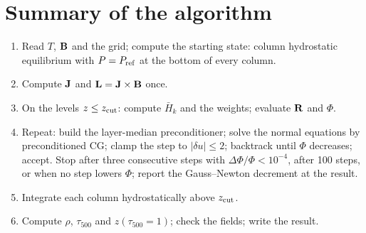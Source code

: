 \adjointpoissontrue


\section{Summary of the algorithm}
\begin{enumerate}
\item Read $T$, $\mathbf B$ and the grid; compute the starting state: column hydrostatic equilibrium with $P=P_{\rm ref}$ at the bottom
of every column.
\item Compute $\mathbf J$ and $\mathbf L=\mathbf J\times\mathbf B$ once.
\item On the levels $z\le z_{\rm cut}$: compute $\bar H_k$ and the weights; evaluate $\mathbf R$ and $\Phi$.
\item Repeat: build the layer-median preconditioner; solve the normal equations by preconditioned CG; clamp the step to
$|\delta u|\le2$; backtrack until $\Phi$ decreases; accept. Stop after three consecutive steps with
$\Delta\Phi/\Phi<10^{-4}$, after 100 steps, or when no step lowers $\Phi$; report the Gauss--Newton decrement at the result.
\item Integrate each column hydrostatically above $z_{\rm cut}$.
\item Compute $\rho$, $\tau_{500}$ and $z(\tau_{500}=1)$; check the fields; write the result.
\end{enumerate}

